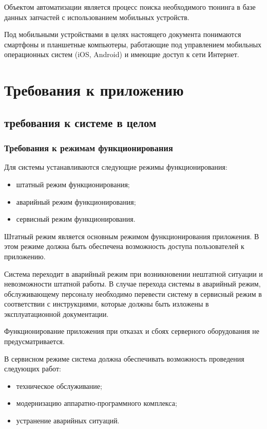 \documentclass[14pt]{extreport}
\begin{document}
Объектом автоматизации является процесс поиска необходимого тюнинга в базе данных запчастей с использованием мобильных устройств.

Под мобильными устройствами в целях настоящего документа понимаются смартфоны и планшетные компьютеры, работающие под управлением мобильных операционных систем (iOS, Android) и имеющие доступ к сети Интернет.

\chapter{Требования к приложению}
\section{требования к системе в целом}
\subsection{Требования к режимам функционирования}
Для системы устанавливаются следующие режимы функционирования:
\begin{itemize}
	\item штатный режим функционирования;
	\item аварийный режим функционирования;
	\item сервисный режим функционирования.
\end{itemize}

Штатный режим является основным режимом функционирования приложения. В этом режиме должна быть обеспечена возможность доступа пользователей 
к приложению.

Система переходит в аварийный режим при возникновении нештатной ситуации и невозможности штатной работы. В случае перехода системы в аварийный режим, обслуживающему персоналу необходимо перевести систему в сервисный режим 
в соответствии с инструкциями, которые должны быть изложены в эксплуатационной документации.

Функционирование приложения при отказах и сбоях серверного оборудования не предусматривается.

В сервисном режиме система должна обеспечивать возможность проведения следующих работ:
\begin{itemize}
	\item техническое обслуживание;
	\item модернизацию аппаратно-программного комплекса;
	\item устранение аварийных ситуаций.
\end{itemize}
\end{document}
